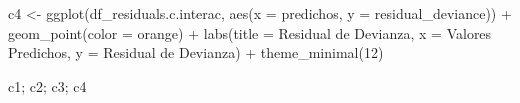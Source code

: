 \documentclass[
  letterpaper,
  DIV=11,
  numbers=noendperiod]{scrartcl}
\newenvironment{Shaded}{\begin{snugshade}}{\end{snugshade}}
\newcommand{\AttributeTok}[1]{\textcolor[rgb]{0.40,0.45,0.13}{#1}}
\newcommand{\DecValTok}[1]{\textcolor[rgb]{0.68,0.00,0.00}{#1}}
\newcommand{\FunctionTok}[1]{\textcolor[rgb]{0.28,0.35,0.67}{#1}}
\newcommand{\NormalTok}[1]{\textcolor[rgb]{0.00,0.23,0.31}{#1}}
\newcommand{\OtherTok}[1]{\textcolor[rgb]{0.00,0.23,0.31}{#1}}
\newcommand{\SpecialCharTok}[1]{\textcolor[rgb]{0.37,0.37,0.37}{#1}}
\newcommand{\StringTok}[1]{\textcolor[rgb]{0.13,0.47,0.30}{#1}}
\begin{document}
\begin{Shaded}
\begin{Highlighting}[]
\NormalTok{c4 }\OtherTok{\textless{}{-}} \FunctionTok{ggplot}\NormalTok{(df\_residuals.c.interac, }\FunctionTok{aes}\NormalTok{(}\AttributeTok{x =}\NormalTok{ predichos, }\AttributeTok{y =}\NormalTok{ residual\_deviance)) }\SpecialCharTok{+}
    \FunctionTok{geom\_point}\NormalTok{(}\AttributeTok{color =} \StringTok{\textquotesingle{}orange\textquotesingle{}}\NormalTok{) }\SpecialCharTok{+}
    \FunctionTok{labs}\NormalTok{(}\AttributeTok{title =} \StringTok{\textquotesingle{}Residual de Devianza\textquotesingle{}}\NormalTok{, }\AttributeTok{x =} \StringTok{\textquotesingle{}Valores Predichos\textquotesingle{}}\NormalTok{, }\AttributeTok{y =} \StringTok{\textquotesingle{}Residual de Devianza\textquotesingle{}}\NormalTok{) }\SpecialCharTok{+}
    \FunctionTok{theme\_minimal}\NormalTok{(}\DecValTok{12}\NormalTok{)}
\end{Highlighting}
\end{Shaded}

\begin{Shaded}
\begin{Highlighting}[]
\NormalTok{c1; c2; c3; c4}
\end{Highlighting}
\end{Shaded}
\end{document}

